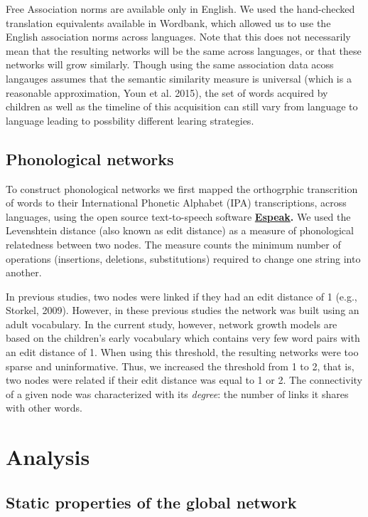 \documentclass[english,floatsintext,man]{apa6}
\theoremstyle{definition}
\theoremstyle{definition}
\theoremstyle{definition}
\theoremstyle{remark}
\begin{document}
Free Association norms are available only in English. We used the
hand-checked translation equivalents available in Wordbank, which
allowed us to use the English association norms across languages. Note
that this does not necessarily mean that the resulting networks will be
the same across languages, or that these networks will grow similarly.
Though using the same association data acoss langauges assumes that the
semantic similarity measure is universal (which is a reasonable
approximation, Youn et al. 2015), the set of words acquired by children
as well as the timeline of this acquisition can still vary from language
to language leading to possbility different learing strategies.

\subsection{Phonological networks}\label{phonological-networks}

To construct phonological networks we first mapped the orthogrphic
transcrition of words to their International Phonetic Alphabet (IPA)
transcriptions, across languages, using the open source text-to-speech
software \textbf{\href{http://http://espeak.sourceforge.net/}{Espeak}.}
We used the Levenshtein distance (also known as edit distance) as a
measure of phonological relatedness between two nodes. The measure
counts the minimum number of operations (insertions, deletions,
substitutions) required to change one string into another.

In previous studies, two nodes were linked if they had an edit distance
of 1 (e.g., Storkel, 2009). However, in these previous studies the
network was built using an adult vocabulary. In the current study,
however, network growth models are based on the children's early
vocabulary which contains very few word pairs with an edit distance of
1. When using this threshold, the resulting networks were too sparse and
uninformative. Thus, we increased the threshold from 1 to 2, that is,
two nodes were related if their edit distance was equal to 1 or 2. The
connectivity of a given node was characterized with its \emph{degree}:
the number of links it shares with other words.

\section{Analysis}\label{analysis}

\subsection{Static properties of the global
network}\label{static-properties-of-the-global-network}
\end{document}
